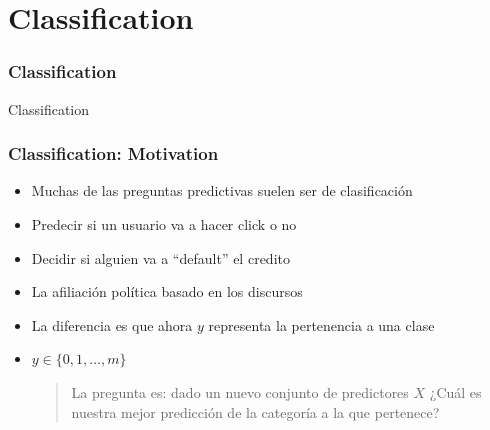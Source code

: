 \documentclass[
  shownotes,
  xcolor={svgnames},
  hyperref={colorlinks,citecolor=DarkBlue,linkcolor=DarkRed,urlcolor=DarkBlue}
  , aspectratio=169]{beamer}
\begin{document}
\section{Classification}
\begin{frame}[fragile]
\frametitle{Classification}


\centering
{\huge \textcolor{andesred}{Classification}}



\end{frame}
\begin{frame}[fragile]
\frametitle{Classification: Motivation}

\begin{itemize}
  \item Muchas de las preguntas predictivas suelen ser de clasificación
  \medskip
  \pause
  \item Predecir si un usuario va a hacer click o no
  \medskip
  \item Decidir si alguien va a ``default'' el credito
  \medskip
  \item La afiliación política basado en los discursos
  \medskip
  \item La diferencia es que ahora $y$ representa la pertenencia a una clase
  \medskip
  \item $y\in \{0,1,\dots,m\}$ 
    \begin{quote}
      La pregunta es: dado un nuevo conjunto de predictores $X$ ¿Cuál es nuestra mejor predicción de la categoría a la que pertenece?
    \end{quote}
\end{itemize}



\end{frame}

\end{document}
